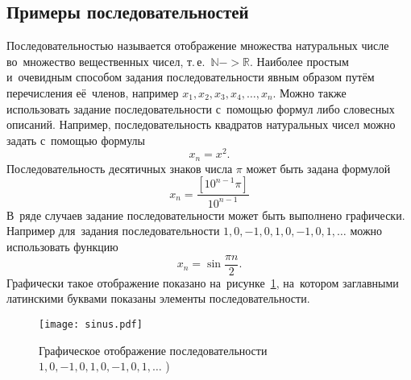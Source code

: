 \documentclass[]{scrartcl}
\begin{document}
\subsection{Примеры последовательностей}
Последовательностью называется отображение множества натуральных числе во~множество вещественных чисел, т.\,е.~$\mathbb{N} -> \mathbb{R}$. Наиболее простым и~очевидным способом задания последовательности явным образом путём перечисления её~членов, например $x_1, x_2, x_3, x_4,\ldots, x_n$. Можно также использовать задание последовательности с~помощью формул либо словесных описаний. Например, последовательность квадратов натуральных чисел можно задать с~помощью формулы
\begin{equation}\label{eq:conseq-squares}
x_n=x^2.
\end{equation}
Последовательность десятичных знаков числа $\pi$ может быть задана формулой
\begin{equation}\label{eq:conseq-pi}
x_n=\frac{[10^{n-1}\pi]}{10^{n-1}}
\end{equation}
В~ряде случаев задание последовательности может быть выполнено графически. Например для~задания последовательности $1, 0, -1, 0, 1, 0, -1, 0, 1,\ldots$ можно использовать функцию
\begin{equation}\label{eq:sinus}
x_n=\sin \frac{\pi n}{2}.
\end{equation}
Графически такое отображение показано на~рисунке~\ref{fig:sinus}, на~котором заглавными латинскими буквами показаны элементы последовательности.
\begin{figure}[ht]
	\centering %
	\texttt{[image: sinus.pdf]}
	\caption{Графическое отображение последовательности $1, 0, -1, 0, 1, 0, -1, 0, 1,\ldots$ )}\label{fig:sinus}
\end{figure}
\end{document}
